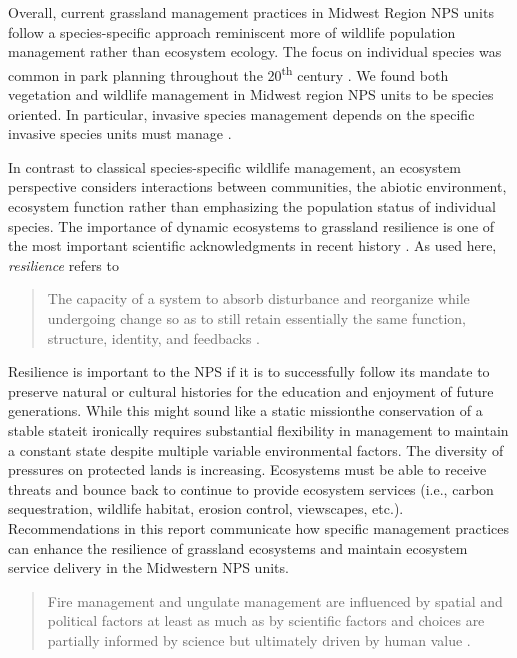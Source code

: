 Overall, current grassland management practices in Midwest Region NPS units follow a species-specific approach reminiscent more of wildlife population management rather than ecosystem ecology. 
The focus on individual species was common in park planning throughout the 20\textsuperscript{th} century \citep{lebel2006}. 
We found both vegetation and wildlife management in Midwest region NPS units to be species oriented. 
In particular, invasive species management depends on the specific invasive species units must manage \citep{bestelmeyer2012}. 

In contrast to classical species-specific wildlife management, an ecosystem perspective considers interactions between communities, the abiotic environment, ecosystem function rather than emphasizing the population status of individual species.
The importance of dynamic ecosystems to grassland resilience is one of the most important scientific acknowledgments in recent history \citep{thomas1996}.
As used here, \emph{resilience} refers to 
\begin{quote}
	The capacity of a system to absorb disturbance and reorganize while undergoing change so as to still retain essentially the same function, structure, identity, and feedbacks \citep{walker2004}. 
\end{quote}

Resilience is important to the NPS if it is to successfully follow its mandate to preserve natural or cultural histories for the education and enjoyment of future generations.
While this might sound like a static mission\textemdash the conservation of a stable state\textemdash it ironically requires substantial flexibility in management to maintain a constant state despite multiple variable environmental factors. 
The diversity of pressures on protected lands is increasing.
Ecosystems must be able to receive threats and bounce back to continue to provide ecosystem services (i.e., carbon sequestration, wildlife habitat, erosion control, viewscapes, etc.). 
Recommendations in this report communicate how specific management practices can enhance the resilience of grassland ecosystems and maintain ecosystem service delivery in the Midwestern NPS units. 

\begin{quote}
Fire management and ungulate management are influenced by spatial and political factors at least as much as by scientific factors and choices are partially informed by science but ultimately driven by human value \citep{cole2012}.
\end{quote}

